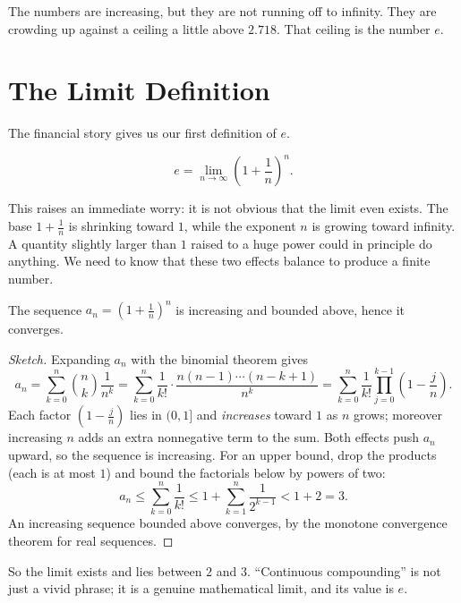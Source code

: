 \documentclass{essay}
\begin{document}
The numbers are increasing, but they are not running off to infinity. They are crowding up against a ceiling a little above $2.718$. That ceiling is the number $e$.

\section{The Limit Definition}

The financial story gives us our first definition of $e$.

\begin{definition}
  \[
    e = \lim_{n \to \infty} \left(1 + \frac{1}{n}\right)^n.
  \]
\end{definition}

This raises an immediate worry: it is not obvious that the limit even exists. The base $1 + \tfrac{1}{n}$ is shrinking toward $1$, while the exponent $n$ is growing toward infinity. A quantity slightly larger than $1$ raised to a huge power could in principle do anything. We need to know that these two effects balance to produce a finite number.

\begin{proposition}
  The sequence $a_n = \left(1 + \tfrac{1}{n}\right)^n$ is increasing and bounded above, hence it converges.
\end{proposition}

\begin{proof}[Sketch]
  Expanding $a_n$ with the binomial theorem gives
  \[
    a_n = \sum_{k=0}^{n} \binom{n}{k}\frac{1}{n^k}
    = \sum_{k=0}^{n} \frac{1}{k!}\cdot\frac{n(n-1)\cdots(n-k+1)}{n^k}
    = \sum_{k=0}^{n} \frac{1}{k!}\prod_{j=0}^{k-1}\left(1 - \frac{j}{n}\right).
  \]
  Each factor $\left(1 - \tfrac{j}{n}\right)$ lies in $(0,1]$ and \emph{increases} toward $1$ as $n$ grows; moreover increasing $n$ adds an extra nonnegative term to the sum. Both effects push $a_n$ upward, so the sequence is increasing. For an upper bound, drop the products (each is at most $1$) and bound the factorials below by powers of two:
  \[
    a_n \le \sum_{k=0}^{n}\frac{1}{k!}
    \le 1 + \sum_{k=1}^{n}\frac{1}{2^{k-1}}
    < 1 + 2 = 3.
  \]
  An increasing sequence bounded above converges, by the monotone convergence theorem for real sequences.
\end{proof}

So the limit exists and lies between $2$ and $3$. ``Continuous compounding'' is not just a vivid phrase; it is a genuine mathematical limit, and its value is $e$.
\end{document}
